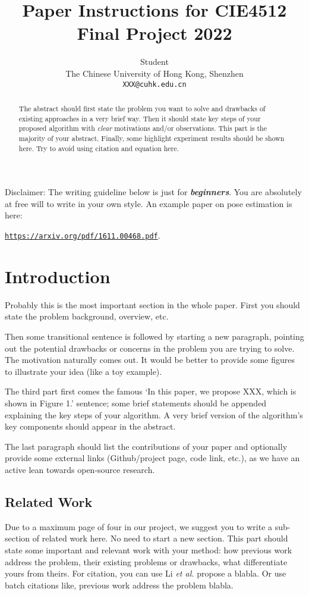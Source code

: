 \documentclass{article}
\title{Paper Instructions for CIE4512 Final Project 2022}
\author{
  Student \\
  The Chinese University of Hong Kong, Shenzhen\\
  \texttt{XXX@cuhk.edu.cn} \\
   \And
}
\begin{document}
\maketitle

\begin{abstract}
  The abstract should first state the problem you want to solve and drawbacks of existing approaches in a very brief way. Then it should state key steps of your proposed algorithm with \textit{clear} motivations and/or observations. This part is the majority of your abstract. Finally, some highlight experiment results should be shown here. Try to avoid using citation and equation here.
\end{abstract}


Disclaimer: The writing guideline below is just for \textbf{\textit{beginners}}. You are absolutely at free will to write in your own style.
%
An example paper on pose estimation is here:

 \href{https://arxiv.org/pdf/1611.00468.pdf}{\texttt{https://arxiv.org/pdf/1611.00468.pdf}}.

\section{Introduction}

Probably this is the most important section in the whole paper. First you should state the problem background, overview, etc.

Then some transitional sentence is followed by starting a new paragraph, pointing out the potential drawbacks or concerns in the problem you are trying to solve. The motivation  naturally comes out. It would be better to provide some figures to illustrate your idea (like a toy example).

The third part first comes the famous `In this paper, we propose XXX, which is shown in Figure 1.' sentence; some brief statements should be appended explaining the key steps of your algorithm. A very brief version of the algorithm's key components should appear in the abstract.

The last paragraph should list the contributions of your paper and optionally provide some external links (Github/project page, code link, etc.), as we have an active lean towards open-source research.

\subsection{Related Work}
Due to a maximum page of four in our project, we suggest you to write a sub-section of related work here. No need to start a new section. This part should state some important and relevant work with your method: how previous work address the problem, their existing problems or drawbacks, what differentiate yours from theirs. For citation, you can use Li \textit{et al.} \cite{MCG} propose a blabla. Or use batch citations like, previous work \cite{bing,scale_aware,Hosang2015Pami} address the problem blabla.
\end{document}
